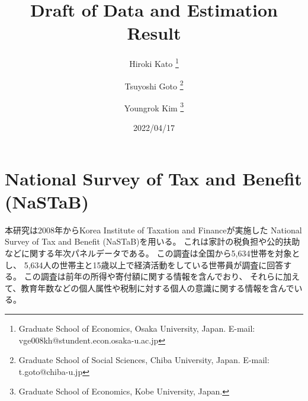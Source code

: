 \documentclass[
  11pt,
  a4paper,
]{article}
\title{Draft of Data and Estimation Result  }
\author{
    Hiroki Kato
  \thanks{Graduate School of Economics, Osaka University, Japan. E-mail: vge008kh@stundent.econ.osaka-u.ac.jp  }
  \and
    Tsuyoshi Goto
  \thanks{Graduate School of Social Sciences, Chiba University, Japan. E-mail: t.goto@chiba-u.jp  }
  \and
    Youngrok Kim
  \thanks{Graduate School of Economics, Kobe University, Japan.  }
  \and
  }
\date{2022/04/17}
\begin{document}
\begin{spacing}{1}
  \maketitle
\end{spacing}

\hypertarget{nastab}{%
\section{National Survey of Tax and Benefit (NaSTaB)}\label{nastab}}

本研究は2008年からKorea Institute of Taxation and Financeが実施した
National Survey of Tax and Benefit (NaSTaB)を用いる。
これは家計の税負担や公的扶助などに関する年次パネルデータである。
この調査は全国から5,634世帯を対象とし、
5,634人の世帯主と15歳以上で経済活動をしている世帯員が調査に回答する。
この調査は前年の所得や寄付額に関する情報を含んでおり、
それらに加えて、教育年数などの個人属性や税制に対する個人の意識に関する情報を含んでいる。
\end{document}
